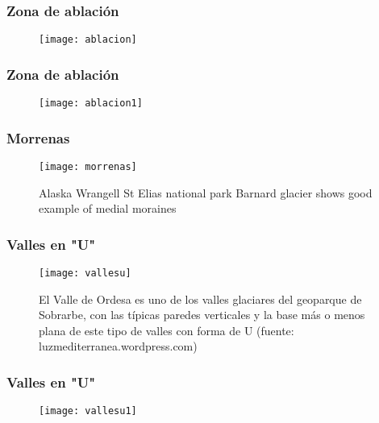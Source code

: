 \documentclass{beamer}
\begin{document}
\begin{frame}
\frametitle{Zona de ablación}
\begin{figure}
\begin{center}
\texttt{[image: ablacion]}
\end{center}
\end{figure}
\end{frame}
\begin{frame}
\frametitle{Zona de ablación}
\begin{figure}
\begin{center}
\texttt{[image: ablacion1]}
\end{center}
\end{figure}
\end{frame}
\begin{frame}
\frametitle{Morrenas}
\begin{figure}
\begin{center}
\texttt{[image: morrenas]}
\end{center}
\caption{Alaska Wrangell St Elias national park Barnard glacier shows good example of medial moraines}
\end{figure}
\end{frame}
\begin{frame}
\frametitle{Valles en "U"}
\begin{figure}
\begin{center}
\texttt{[image: vallesu]}
\end{center}
\caption{El Valle de Ordesa es uno de los valles glaciares del geoparque de Sobrarbe, con las típicas paredes verticales y la base más o menos plana de este tipo de valles con forma de U (fuente: luzmediterranea.wordpress.com)}
\end{figure}
\end{frame}
\begin{frame}
\frametitle{Valles en "U"}
\begin{figure}
\begin{center}
\texttt{[image: vallesu1]}
\end{center}
\end{figure}
\end{frame}
\end{document}
